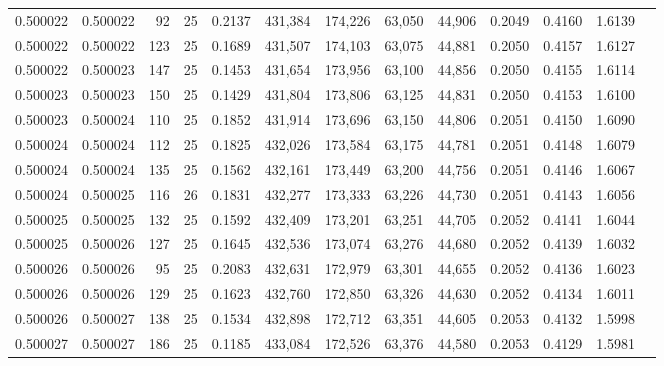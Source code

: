 \begin{tabular}{rrrrrrrrrrrrr}
0.500022 & 0.500022 &  92 &  25 &                                     0.2137 & 431,384 & 174,226 &  63,050 &  44,906 & 0.2049 & 0.4160 & 1.6139 \\
0.500022 & 0.500022 & 123 &  25 &                                     0.1689 & 431,507 & 174,103 &  63,075 &  44,881 & 0.2050 & 0.4157 & 1.6127 \\
0.500022 & 0.500023 & 147 &  25 &                                     0.1453 & 431,654 & 173,956 &  63,100 &  44,856 & 0.2050 & 0.4155 & 1.6114 \\
0.500023 & 0.500023 & 150 &  25 &                                     0.1429 & 431,804 & 173,806 &  63,125 &  44,831 & 0.2050 & 0.4153 & 1.6100 \\
0.500023 & 0.500024 & 110 &  25 &                                     0.1852 & 431,914 & 173,696 &  63,150 &  44,806 & 0.2051 & 0.4150 & 1.6090 \\
0.500024 & 0.500024 & 112 &  25 &                                     0.1825 & 432,026 & 173,584 &  63,175 &  44,781 & 0.2051 & 0.4148 & 1.6079 \\
0.500024 & 0.500024 & 135 &  25 &                                     0.1562 & 432,161 & 173,449 &  63,200 &  44,756 & 0.2051 & 0.4146 & 1.6067 \\
0.500024 & 0.500025 & 116 &  26 &                                     0.1831 & 432,277 & 173,333 &  63,226 &  44,730 & 0.2051 & 0.4143 & 1.6056 \\
0.500025 & 0.500025 & 132 &  25 &                                     0.1592 & 432,409 & 173,201 &  63,251 &  44,705 & 0.2052 & 0.4141 & 1.6044 \\
0.500025 & 0.500026 & 127 &  25 &                                     0.1645 & 432,536 & 173,074 &  63,276 &  44,680 & 0.2052 & 0.4139 & 1.6032 \\
0.500026 & 0.500026 &  95 &  25 &                                     0.2083 & 432,631 & 172,979 &  63,301 &  44,655 & 0.2052 & 0.4136 & 1.6023 \\
0.500026 & 0.500026 & 129 &  25 &                                     0.1623 & 432,760 & 172,850 &  63,326 &  44,630 & 0.2052 & 0.4134 & 1.6011 \\
0.500026 & 0.500027 & 138 &  25 &                                     0.1534 & 432,898 & 172,712 &  63,351 &  44,605 & 0.2053 & 0.4132 & 1.5998 \\
0.500027 & 0.500027 & 186 &  25 &                                     0.1185 & 433,084 & 172,526 &  63,376 &  44,580 & 0.2053 & 0.4129 & 1.5981 \\

\end{tabular}
